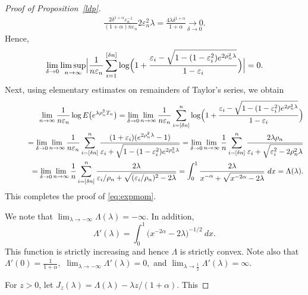 \documentclass[12pt]{amsart}
\begin{document}
\begin{proof}[Proof of Proposition~\ref{ldp}]
\begin{eqnarray*}
\frac{2 \delta^{1+\alpha}{\varepsilon}_n^{-1}}{(1+\alpha)n{\varepsilon}_n}2{\varepsilon}_n^2 \lambda
= {\frac {\displaystyle {4 \lambda \delta^{1+\alpha}}}{\displaystyle {1+\alpha} }}\underset{\delta\to 0}{\longrightarrow 0}.
\end{eqnarray*}
Hence,
\begin{eqnarray*}
\lim_{\delta\to0}\limsup_{n\to\infty} \Bigl|\frac{1}{n{\varepsilon}_n}\sum_{i=1}^{[\delta n]}
\log\Bigl(1+{\frac {\displaystyle {{\varepsilon}_i-\sqrt{1-(1-{\varepsilon}_i^2)e^{2\rho_n^2 \lambda}}}}{\displaystyle {1-{\varepsilon}_i} }}\Bigr)\Bigr|=0.
\end{eqnarray*}
Next, using elementary estimates on remainders of Taylor's series, we obtain
\begin{eqnarray*}
&&
\lim_{n\to\infty} \frac{1}{n{\varepsilon}_n } \log E\bigl(e^{\lambda\rho_n^2  T_n}\bigr)
=
\lim_{\delta\to 0} \lim_{n\to\infty}
\frac{1}{n{\varepsilon}_n}\sum_{i=[\delta n]}^n
\log\Bigl(1+{\frac {\displaystyle {{\varepsilon}_i-\sqrt{1-(1-{\varepsilon}_i^2)e^{2\rho_n^2 \lambda}}}}{\displaystyle {1-{\varepsilon}_i} }}\Bigr)
\\
&&
\qquad
=
\lim_{\delta\to 0} \lim_{n\to\infty}
\frac{1}{n{\varepsilon}_n} \sum_{i=[\delta n]}^n
{\frac {\displaystyle {(1+{\varepsilon}_i)(e^{2\rho_n^2 \lambda}-1)}}{\displaystyle {{\varepsilon}_i+\sqrt{1-(1-{\varepsilon}_i^2)e^{2\rho_n^2\lambda}}} }}
=
\lim_{\delta\to 0} \lim_{n\to\infty}
\frac{1}{n}\sum_{i=[\delta n]}^n
{\frac {\displaystyle {2\lambda\rho_n}}{\displaystyle {{\varepsilon}_i+\sqrt{{\varepsilon}_i^2-2\rho_n^2 \lambda}} }}
\\
&&
\qquad
=
\lim_{\delta\to 0} \lim_{n\to\infty}
\frac{1}{n}\sum_{i=[\delta n]}^n
{\frac {\displaystyle {2\lambda}}{\displaystyle {{\varepsilon}_i/\rho_n+\sqrt{({\varepsilon}_i/\rho_n)^2-
2\lambda}} }}
=
\int_0^1 {\frac {\displaystyle {2\lambda}}{\displaystyle {x^{-\alpha}+
\sqrt{x^{-2\alpha}-2\lambda}} }}~dx
=\Lambda(\lambda).
\end{eqnarray*}
This completes the proof of \eqref{eq:expmom}.
\par
We note that $\lim_{\lambda \to -\infty}\Lambda(\lambda) = -\infty$.  In addition,
$$\Lambda'(\lambda)
=
\int_0^1
\bigl(x^{-2\alpha}-2\lambda\bigr)^{-1/2}~dx.
$$
This function is strictly increasing and hence $\Lambda$ is strictly
convex.  Note also that $\Lambda'(0)=\frac{1}{1+\alpha},$
$\lim_{\lambda \to -\infty} \Lambda'(\lambda)=0,$ and
$\lim_{\lambda\to \frac 12} \Lambda'(\lambda) =\infty$.
\par
For $z>0$, let $J_z(\lambda) = \Lambda(\lambda)-\lambda z/(1+\alpha)$.  This

\end{proof}
\end{document}
